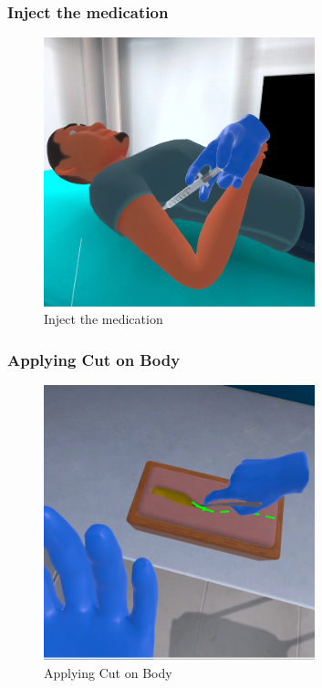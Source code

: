 \subsubsection{Inject the medication}
\begin{figure}[h]
	\centering
	\includegraphics[width=0.7\textwidth, height=0.3\textheight]{Images/Inject the medication.png}
	\caption{Inject the medication}
	\label{fig:Inject the medication}
\end{figure}
\newpage
\subsubsection{Applying Cut on Body}
\begin{figure}[h]
	\centering
	\includegraphics[width=0.7\textwidth, height=0.3\textheight]{Images/Applying Cut on Body.png}
	\caption{Applying Cut on Body}
	\label{fig:Applying Cut on Body}
\end{figure}
\newpage

